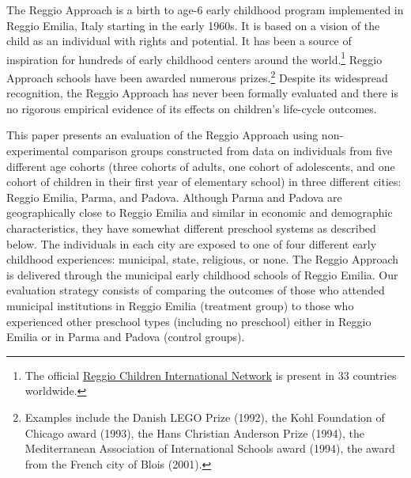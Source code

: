 The Reggio Approach is a birth to age-6 early childhood program implemented in Reggio Emilia, Italy starting in the early 1960s. It is based on a vision of the child as an individual with rights and potential. It has been a source of inspiration for hundreds of early childhood centers around the world.\footnote{The official \href{http://www.reggiochildren.it/network/?lang=en}{Reggio Children International Network} is present in 33 countries worldwide.} Reggio Approach schools have been awarded numerous prizes.\footnote{Examples include the Danish LEGO Prize (1992), the Kohl Foundation of Chicago award (1993), the Hans Christian Anderson Prize (1994), the Mediterranean Association of International Schools award (1994), the award from the French city of Blois (2001).} Despite its widespread recognition, the Reggio Approach has never been formally evaluated and there is no rigorous empirical evidence of its effects on children's life-cycle outcomes.

This paper presents an evaluation of the Reggio Approach using non-experimental comparison groups constructed from data on individuals from five different age cohorts (three cohorts of adults, one cohort of adolescents, and one cohort of children in their first year of elementary school) in three different cities: Reggio Emilia, Parma, and Padova. Although Parma and Padova are geographically close to Reggio Emilia and similar in economic and demographic characteristics, they have somewhat different preschool systems as described below. The individuals in each city are exposed to one of four different early childhood experiences: municipal, state, religious, or none. The Reggio Approach is delivered through the municipal early childhood schools of Reggio Emilia. Our evaluation strategy consists of comparing the outcomes of those who attended municipal institutions in Reggio Emilia (treatment group) to those who experienced other preschool types (including no preschool) either in Reggio Emilia or in Parma and Padova (control groups).

